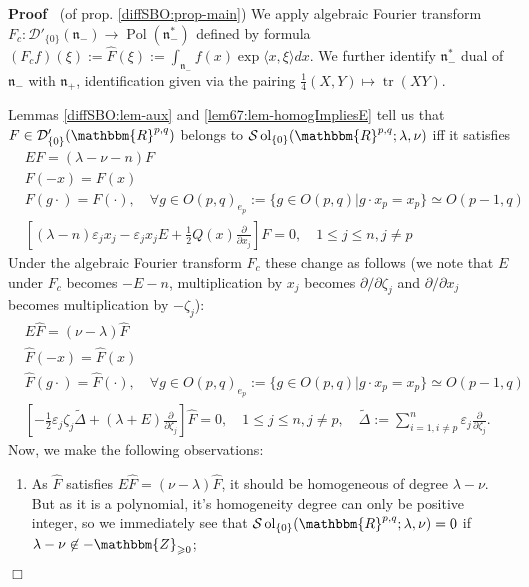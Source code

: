 \documentclass[12pt]{article}
\newcommand{\assign}{:=}
\newcommand{\nin}{\not\in}
\newcommand{\nocomma}{}
\newcommand{\tmop}[1]{\ensuremath{\operatorname{#1}}}
\renewenvironment{proof}{\noindent\textbf{Proof\ }}{\hspace*{\fill}$\Box$\medskip}
\theoremstyle{remark}
\begin{document}
\begin{proof}
  (of prop. \ref{diffSBO:prop-main}) We apply algebraic Fourier transform $F_c
  : \mathcal{D}'_{\{ 0 \}} (\mathfrak{n}_-) \rightarrow \tmop{Pol}
  (\mathfrak{n}_-^{\ast})^{}$ defined by formula $(F_c f) (\xi) \assign
  \hat{F} (\xi) \assign \int_{\mathfrak{n}_-}^{} f (x) \exp \langle x, \xi
  \rangle d x$. We further identify $\mathfrak{n}_-^{\ast}$ dual of
  $\mathfrak{n}_-$ with $\mathfrak{n}_+$, identification given via the pairing
  $\frac{1}{4} (X, Y) \mapsto \tmop{tr} (X Y)$.
  
  Lemmas \ref{diffSBO:lem-aux} and \ref{lem67:lem-homogImpliesE} tell us that
  $F \in \mathcal{D}'_{\{ 0 \}} (\mathbbm{R}^{p, q})$ belongs to $\mathcal{S}
  \tmop{ol}_{\{ 0 \}} (\mathbbm{R}^{p, q} ; \lambda, \nu)$ iff it satisfies
  \begin{eqnarray}
    & E F = (\lambda - \nu - n) F &  \nonumber\\
    & F (- x) = F (x) &  \nonumber\\
    & F (g \cdot) = F (\cdot), \quad \forall g \in O (p, q)_{e_p} \assign \{
    g \in O (p, q) | g \cdot x_p = x_p \} \simeq O (p - 1, q) &  \nonumber\\
    & \left[ (\lambda - n) \varepsilon_j x_j - \varepsilon_j x_j E +
    \frac{1}{2} Q (x) \frac{\partial}{\partial x_j} \right] F = 0, \quad 1
    \leqslant j \leqslant n, j \neq p &  \nonumber
  \end{eqnarray}
  Under the algebraic Fourier transform $F_c$ these change as follows (we note
  that $E$ under $F_c$ becomes $- E - n$, multiplication by $x_j$ becomes
  $\partial / \partial \zeta_j$ and $\partial / \partial x_j$ becomes
  multiplication by $- \zeta_j$):
  \begin{eqnarray}
    & E \hat{F} = (\nu - \lambda) \hat{F} &  \nonumber\\
    & \hat{F} (- x) = \hat{F} (x) &  \nonumber\\
    & \hat{F} (g \cdot) = \hat{F} (\cdot), \quad \forall g \in O (p, q)_{e_p}
    \assign \{ g \in O (p, q) | g \cdot x_p = x_p \} \simeq O (p - 1, q) & 
    \nonumber\\
    & \left[ - \frac{1}{2} \varepsilon_j \zeta_j \tilde{\Delta} + (\lambda +
    E) \frac{\partial}{\partial \zeta_j} \right] \hat{F} = 0, \quad 1
    \leqslant j \leqslant n, j \neq p, \quad \tilde{\Delta} \assign \sum_{i =
    1, i \neq p}^n \varepsilon_j \frac{\partial}{\partial \zeta_j} . & 
    \nonumber
  \end{eqnarray}
  Now, we make the following observations:
  \begin{enumerate}
    \item As $\hat{F}$ satisfies $E \hat{F} = (\nu - \lambda) \hat{F}
    \nocomma$, it should be homogeneous of degree $\lambda - \nu$. But as it
    is a polynomial, it's homogeneity degree can only be positive integer, so
    we immediately see that $\mathcal{S} \tmop{ol}_{\{ 0 \}} (\mathbbm{R}^{p,
    q} ; \lambda, \nu) = 0$ if $\lambda - \nu \nin -\mathbbm{Z}_{\geqslant
    0}$;
    

\end{enumerate}
\end{proof}
\end{document}
